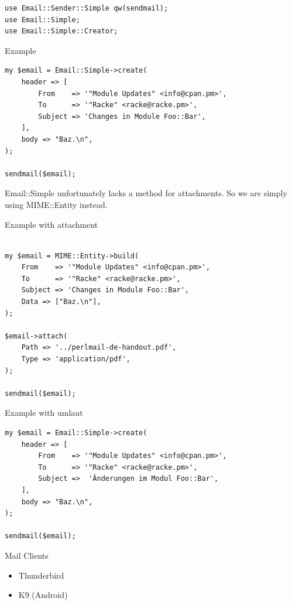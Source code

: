 \begin{lstlisting}
use Email::Sender::Simple qw(sendmail);
use Email::Simple;
use Email::Simple::Creator;
\end{lstlisting}

\begin{frame}[fragile]{Example}
  \begin{verbatim}
my $email = Email::Simple->create(
    header => [
        From    => '"Module Updates" <info@cpan.pm>',
        To      => '"Racke" <racke@racke.pm>',
        Subject => 'Changes in Module Foo::Bar',
    ],
    body => "Baz.\n",
);

sendmail($email);
  \end{verbatim}
\end{frame}

Email::Simple unfortunately lacks a method for attachments. So we are simply
using MIME::Entity instead.

\begin{frame}[fragile]{Example with attachment}
\begin{verbatim}

my $email = MIME::Entity->build(
    From    => '"Module Updates" <info@cpan.pm>',
    To      => '"Racke" <racke@racke.pm>',
    Subject => 'Changes in Module Foo::Bar',
    Data => ["Baz.\n"],
);

$email->attach(
    Path => '../perlmail-de-handout.pdf',
    Type => 'application/pdf',
);

sendmail($email);
  \end{verbatim}
\end{frame}

\begin{frame}[fragile]{Example with umlaut}
  \begin{verbatim}
my $email = Email::Simple->create(
    header => [
        From    => '"Module Updates" <info@cpan.pm>',
        To      => '"Racke" <racke@racke.pm>',
        Subject =>  'Änderungen im Modul Foo::Bar',
    ],
    body => "Baz.\n",
);

sendmail($email);
  \end{verbatim}
\end{frame}

\begin{frame}[fragile]{Mail Clients}

  \begin{itemize}
  \item[\goodsmile] Thunderbird
  \item[\sadsmile] K9 (Android)
  \end{itemize}

\end{frame}

